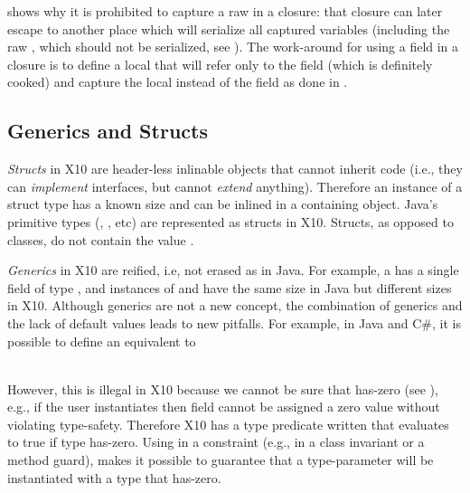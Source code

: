 shows why it is prohibited to capture a raw \this in a closure:
    that closure can later escape to another place which will serialize all captured variables
    (including the raw \this, which should not be serialized, see ).
The work-around for using a field in a closure is to define a local that will refer only to the field (which is definitely cooked)
    and capture the local instead of the field as done in .



\subsection{Generics and Structs}
\label{Section:Generics-and-Structs}
\emph{Structs} in X10 are header-less inlinable objects
    that cannot inherit code (i.e., they can \emph{implement} interfaces, but cannot \emph{extend} anything).
Therefore an instance of a struct type has a known size and can be inlined in a containing object.
Java's primitive types (, , etc) are represented as structs in X10.
Structs, as opposed to classes, do not contain the value .

\emph{Generics} in X10 are reified, i.e, not erased as in Java.
For example, a  has a single field of type ,
    and instances of  and 
    have the same size in Java but different sizes in X10.
Although generics are not a new concept,
    the combination of generics and the lack of default values
    leads to new pitfalls.
For example, in Java and C\#, it is possible to define an equivalent to

~~~~~~~\\
However, this is illegal in X10 because we cannot be sure that  has-zero (see ),
    e.g., if the user instantiates  then field  cannot be assigned a zero value
    without violating type-safety.
Therefore X10 has a type predicate written  that evaluates to true if type  has-zero.
Using  in a constraint (e.g., in a class invariant or a method guard),
    makes it possible to guarantee that a type-parameter will be instantiated with a type that has-zero.

